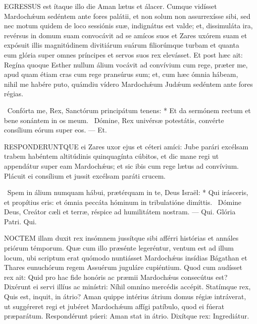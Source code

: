 
\lettrine[lines=2]{E}{GRESSUS} est ítaque illo die Aman lætus et álacer. Cumque vidísset Mardochǽum sedéntem ante fores palátii, et non solum non assurrexísse sibi, sed nec motum quidem de loco sessiónis suæ, indignátus est valde; et, dissimuláta ira, revérsus in domum suam convocávit ad se amícos suos et Zares uxórem suam et expósuit illis magnitúdinem divitiárum suárum filiorúmque turbam et quanta eum glória super omnes príncipes et servos suos rex elevásset. Et post hæc ait: Regína quoque Esther nullum álium vocávit ad convívium cum rege, præter me, apud quam étiam cras cum rege pransúrus sum; et, cum hæc ómnia hábeam, nihil me habére puto, quámdiu vídero Mardochǽum Judǽum sedéntem ante fores régias.

\R\ Confórta me, Rex, Sanctórum principátum tenens: * Et da sermónem rectum et bene sonántem in os meum. \V\ Dómine, Rex univérsæ potestátis, convérte consílium eórum super eos. — Et.



\lettrine[lines=2]{R}{ESPONDERUNTQUE} ei Zares uxor ejus et céteri amíci: Jube parári excélsam trabem habéntem altitúdinis quinquagínta cúbitos, et dic mane regi ut appendátur super eam Mardochǽus; et sic ibis cum rege lætus ad convívium. Plácuit ei consílium et jussit excélsam paráti crucem.

\R\ Spem in álium numquam hábui, prætérquam in te, Deus Israël: * Qui irásceris, et propítius eris: et ómnia peccáta hóminum in tribulatióne dimíttis. \V\ Dómine Deus, Creátor cæli et terræ, réspice ad humilitátem nostram. — Qui. Glória Patri. Qui.




\lettrine[lines=2]{N}{OCTEM} illam duxit rex insómnem jussítque sibi afférri histórias et annáles priórum témporum. Quæ cum illo præsénte legeréntur, ventum est ad illum locum, ubi scriptum erat quómodo nuntiásset Mardochǽus insídias Bágathan et Thares eunuchórum regem Assuérum juguláre cupiéntium. Quod cum audísset rex ait: Quid pro hac fide honóris ac præmii Mardochǽus consecútus est? Dixérunt ei servi illíus ac minístri: Níhil omníno mercédis accépit. Statímque rex, Quis est, inquit, in átrio? Aman quippe intérius átrium domus régiæ intráverat, ut suggéreret regi et jubéret Mardochǽum affígi patíbulo, quod ei fúerat præparátum. Respondérunt púeri: Aman stat in átrio. Dixítque rex: Ingrediátur.

